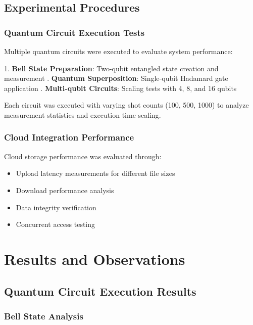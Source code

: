 \documentclass[conference]{IEEEtran}
\begin{document}
\subsection{Experimental Procedures}

\subsubsection{Quantum Circuit Execution Tests}

Multiple quantum circuits were executed to evaluate system performance:

\begin{center}
    1. \textbf{Bell State Preparation}: Two-qubit entangled state creation and measurement 
    . \textbf{Quantum Superposition}: Single-qubit Hadamard gate application . \textbf{Multi-qubit Circuits}: Scaling tests with 4, 8, and 16 qubits
\end{center}
    
    
Each circuit was executed with varying shot counts (100, 500, 1000) to analyze measurement statistics and execution time scaling.

\subsubsection{Cloud Integration Performance}

Cloud storage performance was evaluated through:
\begin{itemize}
    \item Upload latency measurements for different file sizes
    \item Download performance analysis
    \item Data integrity verification
    \item Concurrent access testing
\end{itemize}

\section{Results and Observations}

\subsection{Quantum Circuit Execution Results}

\subsubsection{Bell State Analysis}
\end{document}
